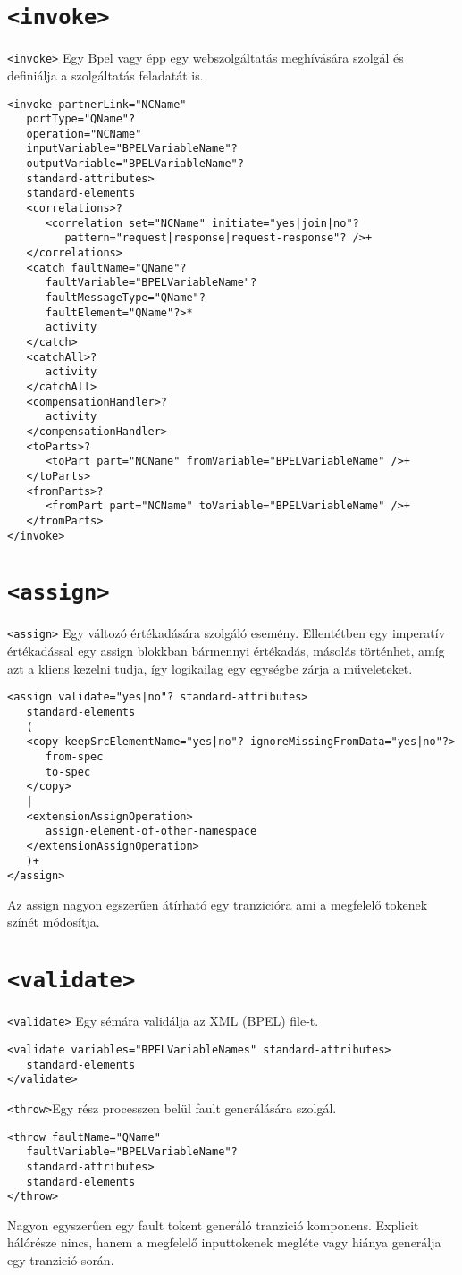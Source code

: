 \documentclass[12pt,a4paper]{book}
\begin{document}
\section{\texttt{<invoke>}}
\texttt{<invoke>} Egy Bpel vagy épp egy webszolgáltatás meghívására szolgál és definiálja a szolgáltatás feladatát is. 
\begin{verbatim}
<invoke partnerLink="NCName"
   portType="QName"?
   operation="NCName"
   inputVariable="BPELVariableName"?
   outputVariable="BPELVariableName"?
   standard-attributes>
   standard-elements
   <correlations>?
      <correlation set="NCName" initiate="yes|join|no"?
         pattern="request|response|request-response"? />+
   </correlations>
   <catch faultName="QName"?
      faultVariable="BPELVariableName"?
      faultMessageType="QName"?
      faultElement="QName"?>*
      activity
   </catch>
   <catchAll>?
      activity
   </catchAll>
   <compensationHandler>?
      activity
   </compensationHandler>
   <toParts>?
      <toPart part="NCName" fromVariable="BPELVariableName" />+
   </toParts>
   <fromParts>?
      <fromPart part="NCName" toVariable="BPELVariableName" />+
   </fromParts>
</invoke>
\end{verbatim}

\section{\texttt{<assign>}}
\texttt{<assign>} Egy változó értékadására szolgáló esemény. Ellentétben egy imperatív értékadással egy assign blokkban bármennyi értékadás, másolás történhet, amíg azt a kliens kezelni tudja, így logikailag egy egységbe zárja a műveleteket.  
\begin{verbatim}
<assign validate="yes|no"? standard-attributes>
   standard-elements
   (
   <copy keepSrcElementName="yes|no"? ignoreMissingFromData="yes|no"?>
      from-spec
      to-spec
   </copy>
   |
   <extensionAssignOperation>
      assign-element-of-other-namespace
   </extensionAssignOperation>
   )+
</assign>
\end{verbatim}
Az assign nagyon egszerűen átírható egy tranzicióra ami a megfelelő tokenek színét módosítja. 

\section{\texttt{<validate>}}
\texttt{<validate>} Egy sémára validálja az XML (BPEL) file-t. 
\begin{verbatim}
<validate variables="BPELVariableNames" standard-attributes>
   standard-elements
</validate>
\end{verbatim}
\texttt{<throw>}Egy rész processzen belül fault generálására szolgál. 
\begin{verbatim}
<throw faultName="QName"
   faultVariable="BPELVariableName"?
   standard-attributes>
   standard-elements
</throw>
\end{verbatim}
Nagyon egyszerűen egy fault tokent generáló tranzició komponens. Explicit hálórésze nincs, hanem a megfelelő inputtokenek megléte vagy hiánya generálja egy tranzició során. 
\end{document}
